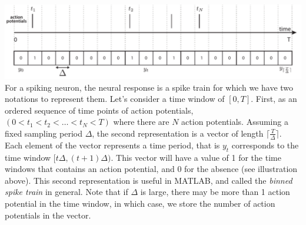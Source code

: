 \documentclass[letterpaper,11pt]{exam}
\DeclareMathOperator*{\E}{\mathbb{E}} %
\newcommand{\funfact}{\textbf{Fun Fact:}~}
\begin{document}
\begin{questions}

\newpage

\includegraphics[width=\textwidth]{binned_spike_train}
For a spiking neuron, the neural response is a spike train for which we have two notations to represent them.
Let's consider a time window of $[0, T]$.
First, as an ordered sequence of time points of action potentials, $(0 < t_1 < t_2 < \ldots < t_N < T)$ where there are $N$ action potentials.
Assuming a fixed sampling period $\Delta$, the second representation is a vector of length $\lceil\frac{T}{\Delta}\rceil$.
Each element of the vector represents a time period, that is $y_t$ corresponds to the time window $[t\Delta, (t+1)\Delta)$.
This vector will have a value of 1 for the time windows that contains an action potential, and 0 for the absence (see illustration above).
This second representation is useful in MATLAB, and called the \emph{binned spike train} in general.
Note that if $\Delta$ is large, there may be more than 1 action potential in the time window, in which case, we store the number of action potentials in the vector.


\end{questions}
\end{document}
